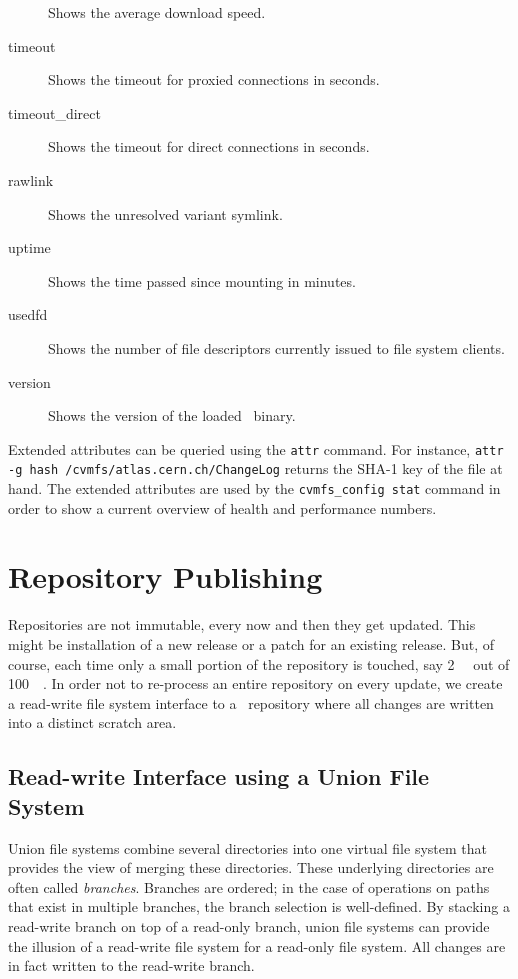 \begin{description}
		Shows the average download speed.
	\item[timeout]
		Shows the timeout for proxied connections in seconds.
	\item[timeout\_direct]
		Shows the timeout for direct connections in seconds.
	\item[rawlink]
		Shows the unresolved variant symlink.	
	\item[uptime]
		Shows the time passed since mounting in minutes.
	\item[usedfd]
		Shows the number of file descriptors currently issued to file system clients.		
	\item[version]
		Shows the version of the loaded \cvmfs\ binary.	
\end{description}

Extended attributes can be queried using the \texttt{attr} command.
For instance, \texttt{attr -g hash /cvmfs/atlas.cern.ch/ChangeLog} returns the SHA-1 key of the file at hand.
The extended attributes are used by the \texttt{cvmfs\_config stat} command in order to show a current overview of health and performance numbers.


\section{Repository Publishing}

Repositories are not immutable, every now and then they get updated. 
This might be installation of a new release or a patch for an existing release.  
But, of course, each time only a small portion of the repository is touched, say \SI{2}{\giga\byte} out of \SI{100}{\giga\byte}.
In order not to re-process an entire repository on every update, we create a read-write file system interface to a \cvmfs\ repository where all changes are written into a distinct scratch area.

\subsection{Read-write Interface using a Union File System}
Union file systems combine several directories into one virtual file system that provides the view of merging these directories.
These underlying directories are often called \emph{branches}.
Branches are ordered; in the case of operations on paths that exist in multiple branches, the branch selection is well-defined.
By stacking a read-write branch on top of a read-only branch, union file systems can provide the illusion of a read-write file system for a read-only file system.
All changes are in fact written to the read-write branch.

